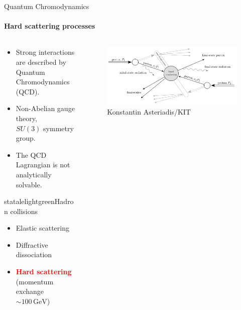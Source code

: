 \begin{frame} {Quantum Chromodynamics}
  \framesubtitle{Hard scattering processes}

   \begin{columns}

    \begin{column}{0.5\textwidth}

    \vspace{0.5em}
    
        \begin{itemize}
            \item Strong interactions are described by Quantum Chromodynamics (QCD).
            \item Non-Abelian gauge theory, \\$SU(3)$ symmetry group.
            \item The QCD Lagrangian is not analytically solvable.
        \end{itemize}

    \vspace{0.5em}
    \pause
    \begin{colorblock}[black]{statalelightgreen}{Hadron collisions}
        \begin{itemize}
          \item Elastic scattering
          \item Diffractive dissociation
          \item \textcolor{red}{\textbf{Hard scattering}} \\(momentum exchange $\sim 100 \,\text{GeV}$)
        \end{itemize}
      \end{colorblock}
    
  
    \end{column}

    \begin{column}{0.5\textwidth}
        \begin{figure}
        \centering
        \includegraphics[width=\textwidth]{imgs/hard-scattering.png}
        \caption{Konstantin Asteriadis/KIT}
      \end{figure}


\end{column}
\end{columns}
\end{frame}
